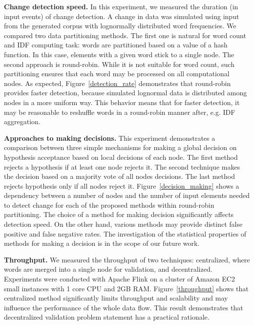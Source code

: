 {\bf Change detection speed.} In this experiment, we measured the duration (in input events) of change detection. A change in data was simulated using input from the generated corpus with lognormally distributed word frequencies. We compared two data partitioning methods. The first one is natural for word count and IDF computing task: words are partitioned based on a value of a hash function. In this case, elements with a given word stick to a single node. The second approach is round-robin. While it is not suitable for word count, such partitioning ensures that each word may be processed on all computational nodes. As expected, Figure~\ref{detection_rate} demonstrates that round-robin provides faster detection, because simulated lognormal data is distributed among nodes in a more uniform way. This behavior means that for faster detection, it may be reasonable to reshuffle words in a round-robin manner after, e.g. IDF aggregation.

{\bf Approaches to making decisions.} This experiment demonstrates a comparison between three simple mechanisms for making a global decision on hypothesis acceptance based on local decisions of each node. The first method rejects a hypothesis if at least one node rejects it. The second technique makes the decision based on a majority vote of all nodes decisions. The last method rejects hypothesis only if all nodes reject it. Figure~\ref{decision_making} shows a dependency between a number of nodes and the number of input elements needed to detect change for each of the proposed methods within round-robin partitioning. The choice of a method for making decision significantly affects detection speed. On the other hand, various methods may provide distinct false positive and false negative rates. The investigation of the statistical properties of methods for making a decision is in the scope of our future work.

{\bf Throughput.} We measured the throughput of two techniques: centralized, where words are merged into a single node for validation, and decentralized. Experiments were conducted with Apache Flink on a cluster of Amazon EC2 small instances with 1 core CPU and 2GB RAM. Figure~\ref{throughput} shows that centralized method significantly limits throughput and scalability and may influence the performance of the whole data flow. This result demonstrates that decentralized validation problem statement has a practical rationale.
